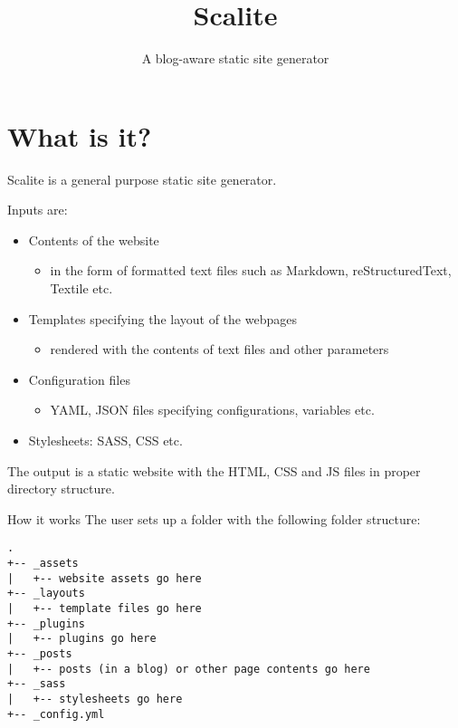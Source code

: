 \documentclass[compress, aspectratio=169]{beamer}
\title{Scalite}
\subtitle{A blog-aware static site generator}
\begin{document}
\begin{frame}
  \maketitle
\end{frame}

\section{What is it?}

\begin{frame}
    Scalite is a general purpose static site generator. 

    Inputs are:
    \begin{itemize}
        \item Contents of the website
            \begin{itemize}
                \item in the form of formatted text files such as Markdown,
                    reStructuredText, Textile etc.
            \end{itemize}
            \pause
        \item Templates specifying the layout of the webpages
            \begin{itemize}
                \item rendered with the contents of text files and other parameters
            \end{itemize}
            \pause
        \item Configuration files
            \begin{itemize}
                \item YAML, JSON files specifying configurations, variables etc.
            \end{itemize}
            \pause
        \item Stylesheets: SASS, CSS etc.
    \end{itemize}
    \pause

    The output is a static website with the HTML, CSS and JS files in proper directory
    structure.
\end{frame}

\begin{frame}[fragile]{How it works}
    The user sets up a folder with the following folder structure:
\begin{lstlisting}[style=fonts]
.
+-- _assets
|   +-- website assets go here
+-- _layouts
|   +-- template files go here
+-- _plugins
|   +-- plugins go here
+-- _posts
|   +-- posts (in a blog) or other page contents go here
+-- _sass
|   +-- stylesheets go here
+-- _config.yml
\end{lstlisting}
\end{frame}
\end{document}
